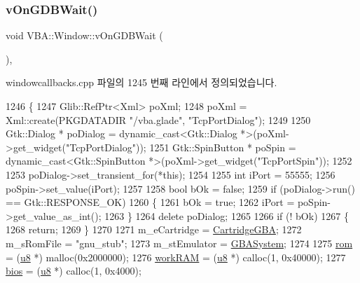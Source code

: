 \subsubsection{\texorpdfstring{v\+On\+G\+D\+B\+Wait()}{vOnGDBWait()}}
{\footnotesize\ttfamily void V\+B\+A\+::\+Window\+::v\+On\+G\+D\+B\+Wait (\begin{DoxyParamCaption}{ }\end{DoxyParamCaption})\hspace{0.3cm}{\ttfamily [protected]}, {\ttfamily [virtual]}}



windowcallbacks.\+cpp 파일의 1245 번째 라인에서 정의되었습니다.


\begin{DoxyCode}
1246 \{
1247   Glib::RefPtr<Xml> poXml;
1248   poXml = Xml::create(PKGDATADIR \textcolor{stringliteral}{"/vba.glade"}, \textcolor{stringliteral}{"TcpPortDialog"});
1249 
1250   Gtk::Dialog * poDialog = \textcolor{keyword}{dynamic\_cast<}Gtk::Dialog *\textcolor{keyword}{>}(poXml->get\_widget(\textcolor{stringliteral}{"TcpPortDialog"}));
1251   Gtk::SpinButton * poSpin = \textcolor{keyword}{dynamic\_cast<}Gtk::SpinButton *\textcolor{keyword}{>}(poXml->get\_widget(\textcolor{stringliteral}{"TcpPortSpin"}));
1252 
1253   poDialog->set\_transient\_for(*\textcolor{keyword}{this});
1254 
1255   \textcolor{keywordtype}{int} iPort = 55555;
1256   poSpin->set\_value(iPort);  
1257 
1258   \textcolor{keywordtype}{bool} bOk = \textcolor{keyword}{false};
1259   \textcolor{keywordflow}{if} (poDialog->run() == Gtk::RESPONSE\_OK)
1260   \{
1261     bOk = \textcolor{keyword}{true};
1262     iPort = poSpin->get\_value\_as\_int();
1263   \}
1264   \textcolor{keyword}{delete} poDialog;
1265 
1266   \textcolor{keywordflow}{if} (! bOk)
1267   \{
1268     \textcolor{keywordflow}{return};
1269   \}
1270 
1271   m\_eCartridge = \mbox{\hyperlink{class_v_b_a_1_1_window_af580451d3ee7a738a73434858a08fa65a64f96d20685b8bd757b1996f9d0cd906}{CartridgeGBA}};
1272   m\_sRomFile   = \textcolor{stringliteral}{"gnu\_stub"};
1273   m\_stEmulator = \mbox{\hyperlink{_g_b_a_8cpp_a5affbb231a41d8d07f6e8dc9ef59789e}{GBASystem}};
1274 
1275   \mbox{\hyperlink{_globals_8cpp_adafc6ed627110c42f3893c9783f55320}{rom}}         = (\mbox{\hyperlink{_system_8h_aed742c436da53c1080638ce6ef7d13de}{u8}} *) malloc(0x2000000);
1276   \mbox{\hyperlink{_globals_8cpp_ae4b38ed5a2dad2b13b71e540d3fa42d2}{workRAM}}     = (\mbox{\hyperlink{_system_8h_aed742c436da53c1080638ce6ef7d13de}{u8}} *) calloc(1, 0x40000);
1277   \mbox{\hyperlink{gb_globals_8h_aec268401eba88422e56ca0a7a86cb991}{bios}}        = (\mbox{\hyperlink{_system_8h_aed742c436da53c1080638ce6ef7d13de}{u8}} *) calloc(1, 0x4000);

\end{DoxyCode}
